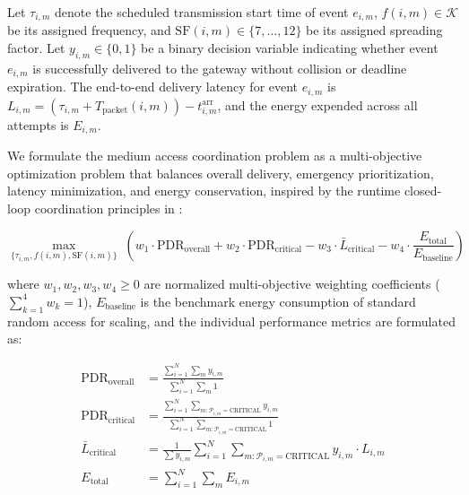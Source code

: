 \documentclass[preprint,review,12pt]{elsarticle}
\begin{document}
Let $\tau_{i,m}$ denote the scheduled transmission start time of event $e_{i,m}$, $f(i,m) \in \mathcal{K}$ be its assigned frequency, and $\text{SF}(i,m) \in \{7, \dots, 12\}$ be its assigned spreading factor. Let $y_{i,m} \in \{0, 1\}$ be a binary decision variable indicating whether event $e_{i,m}$ is successfully delivered to the gateway without collision or deadline expiration. The end-to-end delivery latency for event $e_{i,m}$ is $L_{i,m} = (\tau_{i,m} + T_{\text{packet}}(i,m)) - t_{i,m}^{\text{arr}}$, and the energy expended across all attempts is $E_{i,m}$.

We formulate the medium access coordination problem as a multi-objective optimization problem that balances overall delivery, emergency prioritization, latency minimization, and energy conservation, inspired by the runtime closed-loop coordination principles in \cite{lu2026dynamic}:

\begin{equation}

\label{eq:objective}

\max_{\{\tau_{i,m}, f(i,m), \text{SF}(i,m)\}} \; \left( w_1 \cdot \text{PDR}_{\text{overall}} + w_2 \cdot \text{PDR}_{\text{critical}} - w_3 \cdot \bar{L}_{\text{critical}} - w_4 \cdot \frac{E_{\text{total}}}{E_{\text{baseline}}} \right)

\end{equation}

where $w_1, w_2, w_3, w_4 \ge 0$ are normalized multi-objective weighting coefficients ($\sum_{k=1}^4 w_k = 1$), $E_{\text{baseline}}$ is the benchmark energy consumption of standard random access for scaling, and the individual performance metrics are formulated as:

\begin{align}

\text{PDR}_{\text{overall}} &= \frac{\sum_{i=1}^N \sum_{m} y_{i,m}}{\sum_{i=1}^N \sum_{m} 1} \label{eq:pdr_overall} \\

\text{PDR}_{\text{critical}} &= \frac{\sum_{i=1}^N \sum_{m: \mathcal{P}_{i,m}=\text{CRITICAL}} y_{i,m}}{\sum_{i=1}^N \sum_{m: \mathcal{P}_{i,m}=\text{CRITICAL}} 1} \label{eq:pdr_critical} \\

\bar{L}_{\text{critical}} &= \frac{1}{\sum y_{i,m}} \sum_{i=1}^N \sum_{m: \mathcal{P}_{i,m}=\text{CRITICAL}} y_{i,m} \cdot L_{i,m} \label{eq:lat_critical} \\

E_{\text{total}} &= \sum_{i=1}^N \sum_{m} E_{i,m} \label{eq:e_total}

\end{align}
\end{document}
